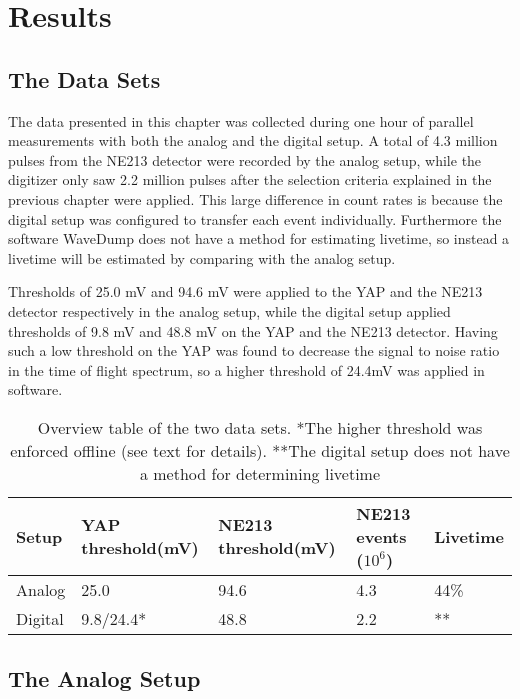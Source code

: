 \documentclass[main.tex]{subfiles}
\begin{document}
\chapter{Results}

\section{The Data Sets}
The data presented in this chapter was collected during one hour of parallel measurements with both the analog and the digital setup. A total of 4.3 million pulses from the NE213 detector were recorded by the analog setup, while the digitizer only saw 2.2 million pulses after the selection criteria explained in the previous chapter were applied. This large difference in count rates is because the digital setup was configured to transfer each event individually. Furthermore the software WaveDump does not have a method for estimating livetime, so instead a livetime will be estimated by comparing with the analog setup.

Thresholds of 25.0 mV and 94.6 mV were applied to the YAP and the NE213 detector respectively in the analog setup, while the digital setup applied thresholds of 9.8 mV and 48.8 mV on the YAP and the NE213 detector. Having such a low threshold on the YAP was found to decrease the signal to noise ratio in the time of flight spectrum, so a higher threshold of 24.4\si{\milli\volt} was applied in software.
\begin{table}[bh]
\begin{tabular}{|l|l|l|l|l|}
\hline
Setup   & YAP threshold(mV) & NE213 threshold(mV) & NE213 events ($\text{10}^\text{6}$) & Livetime \\ \hline
Analog  & 25.0              & 94.6                & 4.3      & 44\%             \\ \hline
Digital & 9.8/24.4*			& 48.8                & 2.2      & **             \\ \hline
\end{tabular}
\caption{Overview table of the two data sets. *The higher threshold was enforced offline (see text for details). **The digital setup does not have a method for determining livetime}
\label{tab:settings}
\end{table}

\section{The Analog Setup}
\end{document}
